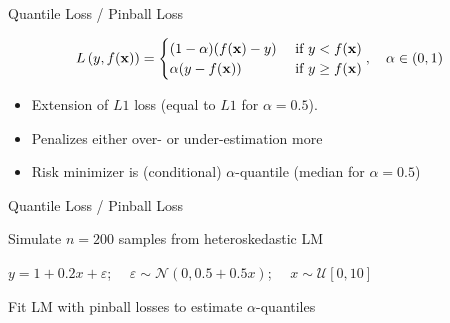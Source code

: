 \documentclass[11pt,compress,t,notes=noshow, xcolor=table]{beamer}
\begin{document}
\begin{frame}{Quantile Loss / Pinball Loss}

$$
L\left(y, f(\mathbf{x})\right) = \begin{cases} (1 - \alpha) (f(\mathbf{x}) - y) & \text{ if } y < f(\mathbf{x})\\
\alpha (y - f(\mathbf{x})) & \text{ if } y \ge f(\mathbf{x})
\end{cases}, \quad \alpha \in (0, 1)
$$

\begin{itemize}
\item Extension of $L1$ loss (equal to $L1$ for $\alpha = 0.5$).
\item Penalizes either over- or under-estimation more
\item Risk minimizer is (conditional) 
    $\alpha$-quantile (median for $\alpha=0.5$)
\end{itemize}

\vfill




\end{frame}

\begin{framei}[sep=M]{Quantile Loss / Pinball Loss}

\item Simulate $n=200$ samples from heteroskedastic LM 
\item $y = 1+0.2x+\varepsilon$; 
$\quad \varepsilon \sim \mathcal{N}(0, 0.5+0.5x)$; $\quad x \sim \mathcal{U}[0,10]$
\item Fit LM with pinball losses to estimate $\alpha$-quantiles 



\end{framei}


\endlecture
\end{document}
